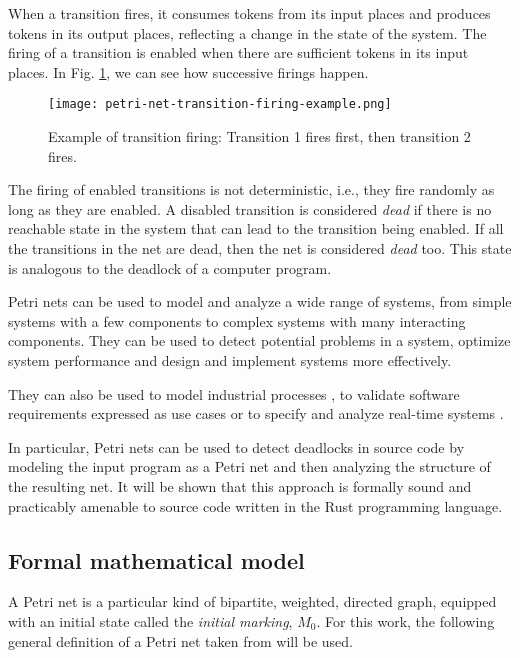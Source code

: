 When a transition fires, it consumes tokens from its input places and
produces tokens in its output places, reflecting a change in the state of the system.
The firing of a transition is enabled when there are sufficient tokens in its input places.
In Fig. \ref{fig:petri-net-transition-firing-example}, we can see how successive firings happen.

\begin{figure}[H]
    \centering
    \texttt{[image: petri-net-transition-firing-example.png]}
    \caption{Example of transition firing: Transition 1 fires first, then transition 2 fires.}
    \label{fig:petri-net-transition-firing-example}
\end{figure}

The firing of enabled transitions is not deterministic, i.e., they fire randomly as long as they are enabled.
A disabled transition is considered \emph{dead}
if there is no reachable state in the system that can lead to the transition being enabled.
If all the transitions in the net are dead, then the net is considered \emph{dead} too.
This state is analogous to the deadlock of a computer program.

Petri nets can be used to model and analyze a wide range of systems,
from simple systems with a few components to complex systems with many interacting components.
They can be used to detect potential problems in a system,
optimize system performance and design and implement systems more effectively.

They can also be used to model industrial processes \cite{aalst1994putting},
to validate software requirements expressed as use cases \cite{silva2004applying}
or to specify and analyze real-time systems \cite{kavi1996specification}.

In particular, Petri nets can be used to detect deadlocks in source code
by modeling the input program as a Petri net and then analyzing the structure of the resulting net.
It will be shown that this approach is formally sound and
practicably amenable to source code written in the Rust programming language.

\subsection{Formal mathematical model}

A Petri net is a particular kind of bipartite, weighted, directed graph,
equipped with an initial state called the \emph{initial marking}, $M_{0}$.
For this work, the following general definition of a Petri net taken from \cite{murata1989} will be used.

